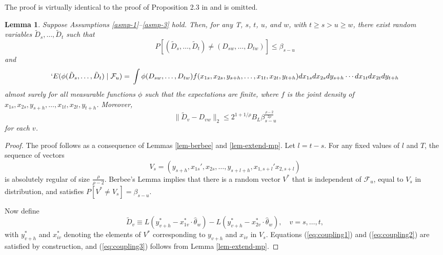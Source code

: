 \documentclass[11pt]{article}
\newtheorem{lem}[thm]{Lemma}
\newcommand{\E}{`E}
\newcommand{\h}{h}
\newcommand{\rhoExp}{\ensuremath{\frac{\rho-2}{2\rho}}}
\newcommand{\absReg}{\ensuremath{\frac\rho{\rho-2}}}
\begin{document}
The proof is virtually identical to the proof of Proposition 2.3 in
\citet{merlevede_coupling_2002} and is omitted.

\begin{lem}\label{lem-basic-coupling}
  Suppose Assumptions \ref{asmp-1}--\ref{asmp-3} hold.  Then, for any
  T, $s$, $t$, $u$, and $w$, with $t \geq s > u \geq w$, there exist random
  variables $\tilde D_s,\dots,\tilde D_t$ such that
  \begin{equation}\label{eq:coupling1}
    P[(\tilde D_s,\dots,\tilde D_t) \neq (D_{sw},\dots,D_{tw})] \leq \beta_{s-u}
  \end{equation}
  and
  \begin{equation}\label{eq:coupling2}
    \E(\phi(\tilde D_s,\dots, \tilde D_t) \mid \mathcal{F}_u ) = \\ 
    \int
    \phi(D_{sw},\dots,D_{tw}) f(x_{1s}, x_{2s}, y_{s+\h}, \dots, x_{1t},
    x_{2t}, y_{t+\h}) dx_{1s} dx_{2s} dy_{s+\h} \cdots dx_{1t} dx_{2t}
    dy_{t+\h}
  \end{equation}
  almost surely for all measurable functions $\phi$ such that the
  expectations are finite, where $f$ is the joint density of $x_{1s},x_{2s},
  y_{s+\h}, \dots, x_{1t}, x_{2t}, y_{t+\h}$.  Moreover,
 \begin{equation}\label{eq:coupling3}
   \| \tilde D_v - D_{vw} \|_2 \leq 2^{1+1/\rho} B_L \beta_{s-u}^\rhoExp
 \end{equation}
for each $v$.
\end{lem}

\begin{proof}
  The proof follows as a consequence of Lemmas \ref{lem-berbee} and
  \ref{lem-extend-mp}.  Let $l = t-s$.  For any fixed values of $l$
  and $T$, the sequence of vectors
  \[ V_s = (y_{s+\h}, x_{1s}', x_{2s}, \dots, y_{s+l+\h}, x_{1,s+l}'
  x_{2,s+l}) \] is absolutely regular of size \absReg.  Berbee's Lemma
  implies that there is a random vector $V^*$ that is independent of
  $\mathcal{F}_u$, equal to $V_s$ in distribution, and satisfies
  $P[V^* \neq V_s] = \beta_{s-u}$.

  Now define
  \[ \tilde D_v \equiv L(y_{v+\h}^* - x_{1v}^* \cdot
  \hat{\theta}_w) - L(y_{v+\h}^* - x_{2v}^* \cdot
  \hat{\theta}_w), \quad v = s,\dotsc, t,
  \]
  with $y_{v+\h}^*$ and $x_{iv}^*$ denoting the elements of $V^*$
  corresponding to $y_{v+\h}$ and $x_{iv}$ in $V_s$.  Equations
  (\ref{eq:coupling1}) and (\ref{eq:coupling2}) are satisfied by
  construction, and (\ref{eq:coupling3}) follows from Lemma
  \ref{lem-extend-mp}.
\end{proof}
\end{document}
